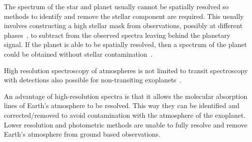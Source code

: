 The spectrum of the star and planet usually cannot be spatially resolved so methods to identify and remove the stellar component are required.
This usually involves constructing a high \snr{} stellar mask from observations, possibly at different phases~\citep[e.g.][]{rodler_weighing_2012}, to subtract from the observed spectra leaving behind the planetary signal.
If the planet is able to be spatially resolved, then a spectrum of the planet could be obtained without stellar contamination~\citep[e.g.][]{snellen_combining_2015}.

High resolution spectroscopy of atmospheres is not limited to transit spectroscopy with detections also possible for non-transiting exoplanets~\citep[e.g.][]{brogi_signature_2012, brogi_carbon_2014,lockwood_nearir_2014, piskorz_evidence_2016}.

An advantage of high-resolution spectra is that it allows the molecular absorption lines of Earth's atmosphere to be resolved.
This way they can be identified and corrected/removed to avoid contamination with the atmosphere of the exoplanet.
 Lower resolution and photometric methods are unable to fully resolve and remove Earth's atmosphere from ground based observations.
